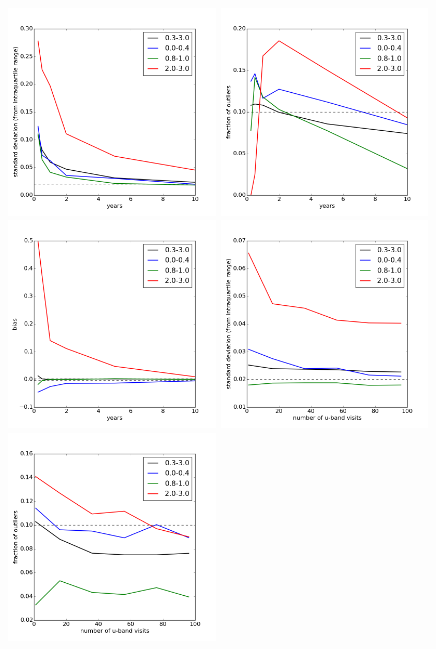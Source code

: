\begin{figure}[h]
\begin{center}
\includegraphics[width=5.5cm]{figs/photoz/nyears_IQR.png}
\includegraphics[width=5.5cm]{figs/photoz/nyears_fout.png}
\includegraphics[width=5.5cm]{figs/photoz/nyears_bias.png}
\includegraphics[width=5.5cm]{figs/photoz/uvisits_IQR.png}
\includegraphics[width=5.5cm]{figs/photoz/uvisits_fout.png}

\end{center}
\end{figure}
